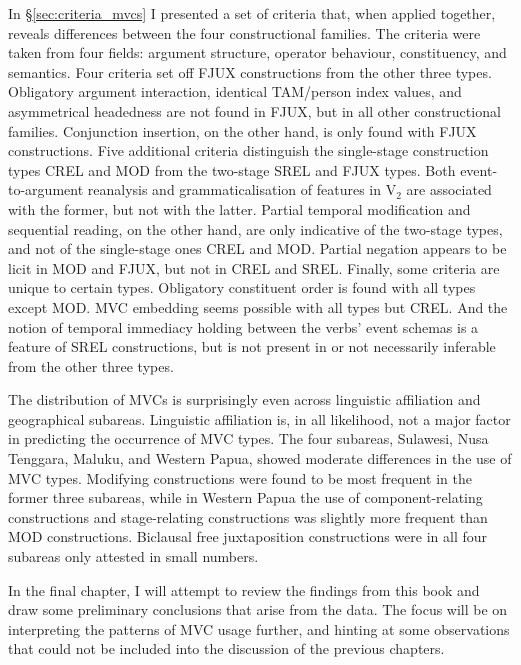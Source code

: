 In §\ref{sec:criteria_mvcs} I presented a set of criteria that, when applied together, reveals differences between the four constructional families. The criteria were taken from four fields: argument structure, operator behaviour, constituency, and semantics. Four criteria set off FJUX constructions from the other three types. Obligatory argument interaction, identical TAM/person index values, and asymmetrical headedness are not found in FJUX, but in all other constructional families. Conjunction insertion, on the other hand, is only found with FJUX constructions. Five additional criteria distinguish the single-stage construction types CREL and MOD from the two-stage SREL and FJUX types. Both event-to-argument reanalysis and grammaticalisation of features in V$_2$ are associated with the former, but not with the latter. Partial temporal modification and sequential reading, on the other hand, are only indicative of the two-stage types, and not of the single-stage ones CREL and MOD. Partial negation appears to be licit in MOD and FJUX, but not in CREL and SREL. Finally, some criteria are unique to certain types. Obligatory constituent order is found with all types except MOD. MVC embedding seems possible with all types but CREL. And the notion of temporal immediacy holding between the verbs' event schemas is a feature of SREL constructions, but is not present in or not necessarily inferable from the other three types.

The distribution of MVCs is surprisingly even across linguistic affiliation and geographical subareas. Linguistic affiliation is, in all likelihood, not a major factor in predicting the occurrence of MVC types. The four subareas, Sulawesi, Nusa Tenggara, Maluku, and Western Papua, showed moderate differences in the use of MVC types. Modifying constructions were found to be most frequent in the former three subareas, while in Western Papua the use of component-relating constructions and stage-relating constructions was slightly more frequent than MOD constructions. Biclausal free juxtaposition constructions were in all four subareas only attested in small numbers. 

In the final chapter, I will attempt to review the findings from this book and draw some preliminary conclusions that arise from the data. The focus will be on interpreting the patterns of MVC usage further, and hinting at some observations that could not be included into the discussion of the previous chapters.
